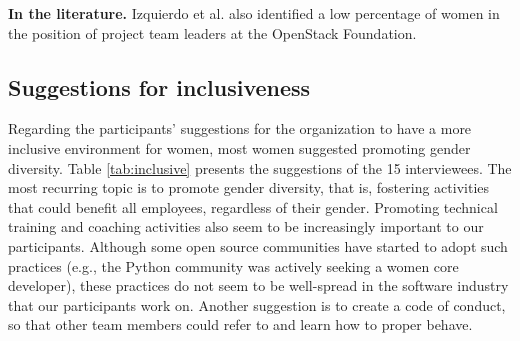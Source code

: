 \documentclass{IEEEcsmag}
\begin{document}



\vspace{0.2cm}
\noindent
\textbf{In the literature.} Izquierdo et al. \cite{DBLP:journals/software/IzquierdoHSR19} also identified a low percentage of women in the position of project team leaders at the OpenStack Foundation.

\subsection{Suggestions for inclusiveness}

Regarding the participants' suggestions for the organization to have a more inclusive environment for women, most women suggested promoting gender diversity. Table \ref{tab:inclusive} presents the suggestions of the 15 interviewees. The most recurring topic is to promote gender diversity, that is, fostering activities that could benefit all employees, regardless of their gender. Promoting technical training and coaching activities also seem to be increasingly important to our participants. Although some open source communities have started to adopt such practices (e.g., the Python community was actively seeking a women core developer), these practices do not seem to be well-spread in the software industry that our participants work on. Another suggestion is  to create a code of conduct, so that other team members could refer to and learn how to proper behave. 
\end{document}
